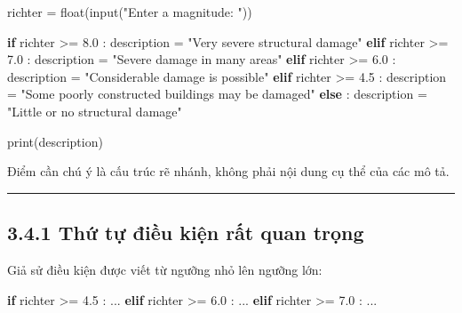 \documentclass[
  11pt,
  a4paper,
]{article}
\newenvironment{Shaded}{}{}
\newcommand{\BuiltInTok}[1]{\textcolor[rgb]{0.00,0.50,0.00}{#1}}
\newcommand{\ControlFlowTok}[1]{\textcolor[rgb]{0.00,0.44,0.13}{\textbf{#1}}}
\newcommand{\FloatTok}[1]{\textcolor[rgb]{0.25,0.63,0.44}{#1}}
\newcommand{\NormalTok}[1]{#1}
\newcommand{\OperatorTok}[1]{\textcolor[rgb]{0.40,0.40,0.40}{#1}}
\newcommand{\StringTok}[1]{\textcolor[rgb]{0.25,0.44,0.63}{#1}}
\begin{document}
\begin{Shaded}
\begin{Highlighting}[]
\NormalTok{richter }\OperatorTok{=} \BuiltInTok{float}\NormalTok{(}\BuiltInTok{input}\NormalTok{(}\StringTok{"Enter a magnitude: "}\NormalTok{))}

\ControlFlowTok{if}\NormalTok{ richter }\OperatorTok{\textgreater{}=} \FloatTok{8.0}\NormalTok{ :}
\NormalTok{    description }\OperatorTok{=} \StringTok{"Very severe structural damage"}
\ControlFlowTok{elif}\NormalTok{ richter }\OperatorTok{\textgreater{}=} \FloatTok{7.0}\NormalTok{ :}
\NormalTok{    description }\OperatorTok{=} \StringTok{"Severe damage in many areas"}
\ControlFlowTok{elif}\NormalTok{ richter }\OperatorTok{\textgreater{}=} \FloatTok{6.0}\NormalTok{ :}
\NormalTok{    description }\OperatorTok{=} \StringTok{"Considerable damage is possible"}
\ControlFlowTok{elif}\NormalTok{ richter }\OperatorTok{\textgreater{}=} \FloatTok{4.5}\NormalTok{ :}
\NormalTok{    description }\OperatorTok{=} \StringTok{"Some poorly constructed buildings may be damaged"}
\ControlFlowTok{else}\NormalTok{ :}
\NormalTok{    description }\OperatorTok{=} \StringTok{"Little or no structural damage"}

\BuiltInTok{print}\NormalTok{(description)}
\end{Highlighting}
\end{Shaded}

Điểm cần chú ý là cấu trúc rẽ nhánh, không phải nội dung cụ thể của các
mô tả.

\begin{center}\rule{0.5\linewidth}{0.5pt}\end{center}

\subsection{3.4.1 Thứ tự điều kiện rất quan
trọng}\label{thux1ee9-tux1ef1-ux111iux1ec1u-kiux1ec7n-rux1ea5t-quan-trux1ecdng}

Giả sử điều kiện được viết từ ngưỡng nhỏ lên ngưỡng lớn:

\begin{Shaded}
\begin{Highlighting}[]
\ControlFlowTok{if}\NormalTok{ richter }\OperatorTok{\textgreater{}=} \FloatTok{4.5}\NormalTok{ :}
\NormalTok{    ...}
\ControlFlowTok{elif}\NormalTok{ richter }\OperatorTok{\textgreater{}=} \FloatTok{6.0}\NormalTok{ :}
\NormalTok{    ...}
\ControlFlowTok{elif}\NormalTok{ richter }\OperatorTok{\textgreater{}=} \FloatTok{7.0}\NormalTok{ :}
\NormalTok{    ...}
\end{Highlighting}
\end{Shaded}
\end{document}
